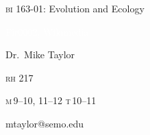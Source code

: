 \documentclass[t]{beamer}
\begin{document}
%
{
\begin{frame}[b]{\textcolor{orange7}{\textsc{bi} 163-01: Evolution and Ecology}}


\hfill\textcolor{white}{\tiny Fir0002, Wikimedia }
\end{frame}
}
%
{
\begin{frame}[t]
	\large
	\vspace{5ex}
	\hangpara\hspace{17em} Dr.~Mike Taylor

	\hangpara\hspace{17em} \textsc{rh} 217

	\hangpara\hspace{17em} \parbox{4cm}{\textsc{m}\,9--10, 11--12 \newline\textsc{t}\,10--11}

	\hangpara\hspace{17em} mtaylor@semo.edu
	

\end{frame}
}
%
{
\begin{frame}
		
\end{frame}
}
%
%		
%		
\end{document}
